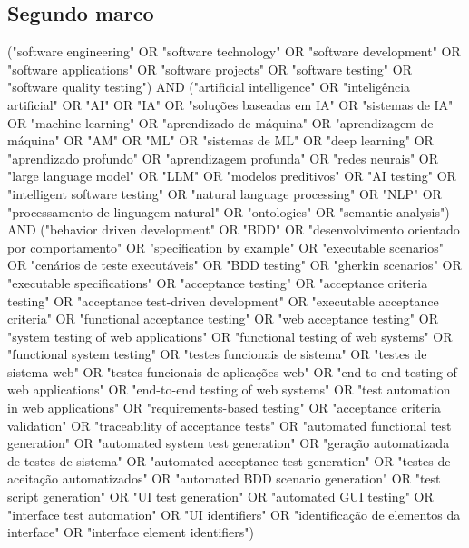 \begin{apendicesenv}
\section{Segundo marco}
\label{ap:string-marco-2}
\begingroup
\small\ttfamily
("software engineering" OR "software technology" OR "software development" OR "software applications" OR "software projects" OR "software testing" OR "software quality testing") AND ("artificial intelligence" OR "inteligência artificial" OR "AI" OR "IA" OR "soluções baseadas em IA" OR "sistemas de IA" OR "machine learning" OR "aprendizado de máquina" OR "aprendizagem de máquina" OR "AM" OR "ML" OR "sistemas de ML" OR "deep learning" OR "aprendizado profundo" OR "aprendizagem profunda" OR "redes neurais" OR "large language model" OR "LLM" OR "modelos preditivos" OR "AI testing" OR "intelligent software testing" OR "natural language processing" OR "NLP" OR "processamento de linguagem natural" OR "ontologies" OR "semantic analysis") AND ("behavior driven development" OR "BDD" OR "desenvolvimento orientado por comportamento" OR "specification by example" OR "executable scenarios" OR "cenários de teste executáveis" OR "BDD testing" OR "gherkin scenarios" OR "executable specifications" OR "acceptance testing" OR "acceptance criteria testing" OR "acceptance test-driven development" OR "executable acceptance criteria" OR "functional acceptance testing" OR "web acceptance testing" OR "system testing of web applications" OR "functional testing of web systems" OR "functional system testing" OR "testes funcionais de sistema" OR "testes de sistema web" OR "testes funcionais de aplicações web" OR "end-to-end testing of web applications" OR "end-to-end testing of web systems" OR "test automation in web applications" OR "requirements-based testing" OR "acceptance criteria validation" OR "traceability of acceptance tests" OR "automated functional test generation" OR "automated system test generation" OR "geração automatizada de testes de sistema" OR "automated acceptance test generation" OR "testes de aceitação automatizados" OR "automated BDD scenario generation" OR "test script generation" OR "UI test generation" OR "automated GUI testing" OR "interface test automation" OR "UI identifiers" OR "identificação de elementos da interface" OR "interface element identifiers")
\par
\endgroup


\end{apendicesenv}

